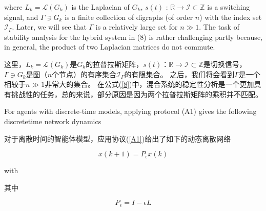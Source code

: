 \documentclass{article}
\begin{document}

{\color[gray]{0.5}
\noindent where $L_k = \mathcal{L}(G_k)$ is the Laplacian of $G_k$, $s(t)$ : $\mathbb{R}\rightarrow \mathcal{I} \subset \mathbb{Z}$ is a switching signal, and {\color{green}$\Gamma\ni G_k$ is a ﬁnite collection of digraphs (of order $n$) with the index set $\mathcal{I}_\Gamma$}. 
Later, we will see that $\Gamma$ is a relatively large set for $n\gg 1$. 
The task of stability analysis for the hybrid system in (8) is rather challenging partly because, in general, the product of two Laplacian matrices do not commute.
}

\noindent 这里，$L_k = \mathcal{L}(G_k)$是$G_k$的拉普拉斯矩阵，$s(t)$：$\mathbb{R}\rightarrow \mathcal{I} \subset \mathbb{Z}$是切换信号，$\Gamma\ni G_k$是图（$n$个节点）的有序集合$\mathcal{I}_\Gamma$的有限集合。
之后，我们将会看到$\Gamma$是一个相较于$n\gg 1$非常大的集合。
在公式(\ref{8})中，混合系统的稳定性分析是一个更加具有挑战性的任务，总的来说，部分原因是因为两个拉普拉斯矩阵的乘积并不匹配。

{\color[gray]{0.5}
For agents with discrete-time models, applying protocol (A1) gives the following discretetime network dynamics
}

对于离散时间的智能体模型，应用协议(\ref{A1})给出了如下的动态离散网络

\begin{equation}
    x(k+1) = P_\epsilon x(k)
    \tag{9}
    \label{9}
\end{equation}


{\color[gray]{0.5}
\noindent with
}

\noindent 其中

\begin{equation}
    P_\epsilon = I - \epsilon L
    \tag{10}
    \label{10}
\end{equation}

\end{document}
